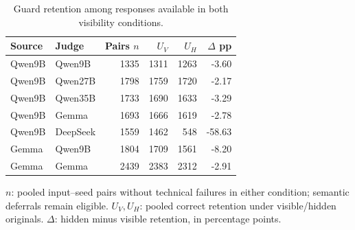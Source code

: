 \begin{table}[t]
\centering
\small
\caption{Guard retention among responses available in both visibility conditions.}
\label{tab:s_availability}
\begin{tabular}{llrrrr}
\toprule
Source & Judge & Pairs $n$ & $U_V$ & $U_H$ & $\Delta$ pp \\
\midrule
Qwen9B & Qwen9B & 1335 & 1311 & 1263 & -3.60 \\
Qwen9B & Qwen27B & 1798 & 1759 & 1720 & -2.17 \\
Qwen9B & Qwen35B & 1733 & 1690 & 1633 & -3.29 \\
Qwen9B & Gemma & 1693 & 1666 & 1619 & -2.78 \\
Qwen9B & DeepSeek & 1559 & 1462 & 548 & -58.63 \\
Gemma & Qwen9B & 1804 & 1709 & 1561 & -8.20 \\
Gemma & Gemma & 2439 & 2383 & 2312 & -2.91 \\
\bottomrule
\end{tabular}
\par\smallskip
\begin{minipage}{\linewidth}
\footnotesize
$n$: pooled input--seed pairs without technical failures in either condition; semantic deferrals remain eligible. $U_V,U_H$: pooled correct retention under visible/hidden originals. $\Delta$: hidden minus visible retention, in percentage points.
\end{minipage}
\end{table}
